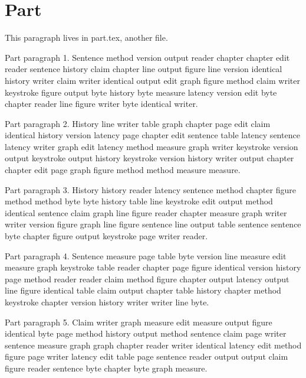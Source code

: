 \section{Part}
This paragraph lives in part.tex, another file.

Part paragraph 1. Sentence method version output reader chapter chapter edit reader sentence history claim chapter line output figure line version identical history writer claim writer identical output edit graph figure method claim writer keystroke figure output byte history byte measure latency version edit byte chapter reader line figure writer byte identical writer.

Part paragraph 2. History line writer table graph chapter page edit claim identical history version latency page chapter edit sentence table latency sentence latency writer graph edit latency method measure graph writer keystroke version output keystroke output history keystroke version history writer output chapter chapter edit page graph figure method method measure measure.

Part paragraph 3. History history reader latency sentence method chapter figure method method byte byte history table line keystroke edit output method identical sentence claim graph line figure reader chapter measure graph writer writer version figure graph line figure sentence line output table sentence sentence byte chapter figure output keystroke page writer reader.

Part paragraph 4. Sentence measure page table byte version line measure edit measure graph keystroke table reader chapter page figure identical version history page method reader reader claim method figure chapter output latency output line figure identical table claim output chapter table history chapter method keystroke chapter version history writer writer line byte.

Part paragraph 5. Claim writer graph measure edit measure output figure identical byte page method history output method sentence claim page writer sentence measure graph graph chapter reader writer identical latency edit method figure page writer latency edit table page sentence reader output output claim figure reader sentence byte chapter byte graph measure.
